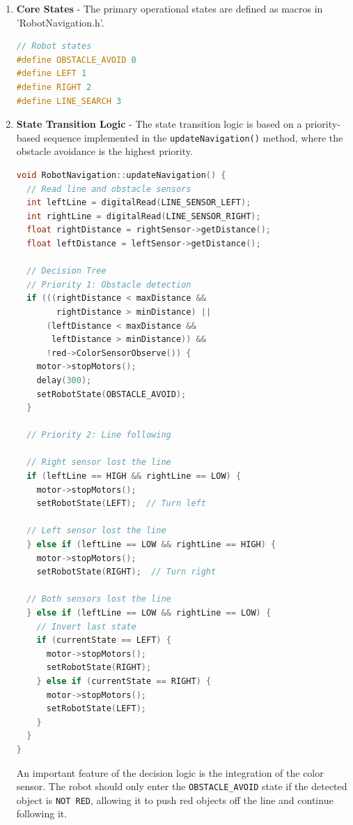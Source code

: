 \documentclass[conference]{IEEEtran}
\begin{document}
\begin{enumerate}[label=\alph*)]

\item \textbf{Core States} - The primary operational states are defined as macros in 'RobotNavigation.h'.
\begin{lstlisting}[language=C++, caption=State Definitions in RobotNavigation.h]
// Robot states
#define OBSTACLE_AVOID 0
#define LEFT 1
#define RIGHT 2
#define LINE_SEARCH 3
\end{lstlisting}

\item \textbf{State Transition Logic} - The state transition logic is based on a priority-based sequence implemented in the \texttt{updateNavigation()} method, where the obstacle avoidance is the highest priority.

\begin{lstlisting}[language=C++, caption=Decision Logic in RobotNavigation.cpp]
void RobotNavigation::updateNavigation() {
  // Read line and obstacle sensors
  int leftLine = digitalRead(LINE_SENSOR_LEFT);
  int rightLine = digitalRead(LINE_SENSOR_RIGHT);
  float rightDistance = rightSensor->getDistance();
  float leftDistance = leftSensor->getDistance();

  // Decision Tree
  // Priority 1: Obstacle detection
  if (((rightDistance < maxDistance &&
        rightDistance > minDistance) ||
      (leftDistance < maxDistance &&
       leftDistance > minDistance)) &&
      !red->ColorSensorObserve()) {
    motor->stopMotors();
    delay(300);
    setRobotState(OBSTACLE_AVOID); 
  }
  
  // Priority 2: Line following 
  
  // Right sensor lost the line
  if (leftLine == HIGH && rightLine == LOW) {
    motor->stopMotors();
    setRobotState(LEFT);  // Turn left
    
  // Left sensor lost the line 
  } else if (leftLine == LOW && rightLine == HIGH) {
    motor->stopMotors();
    setRobotState(RIGHT);  // Turn right
    
  // Both sensors lost the line 
  } else if (leftLine == LOW && rightLine == LOW) {
    // Invert last state  
    if (currentState == LEFT) {
      motor->stopMotors();
      setRobotState(RIGHT);
    } else if (currentState == RIGHT) {
      motor->stopMotors();
      setRobotState(LEFT);
    }
  }
}
\end{lstlisting}

An important feature of the decision logic is the integration of the color sensor. The robot should only enter the \texttt{OBSTACLE\_AVOID} state if the detected object is \texttt{NOT RED}, allowing it to push red objects off the line and continue following it.

\end{enumerate}
\end{document}
